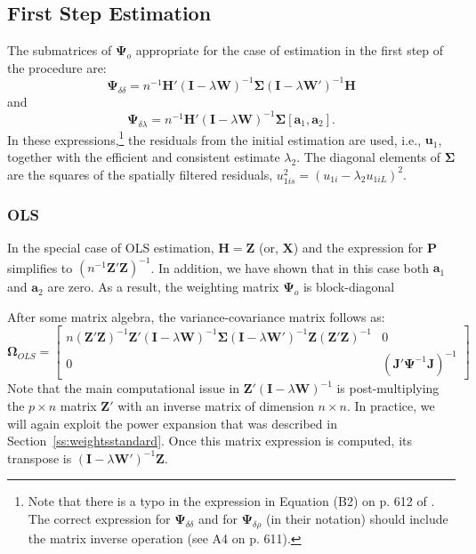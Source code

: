 \documentclass{article}
\begin{document}
\subsection{First Step Estimation}\label{ss:asyvarstandard}
The submatrices of $\mathbf{\Psi}_o$ appropriate for the case of estimation in the
first step of the procedure
are:
\begin{equation}\label{eq:psidd_standard}
\mathbf{\Psi}_{\delta \delta} = n^{-1} \mathbf{H'} (\mathbf{I} - \lambda \mathbf{W} )^{-1} \mathbf{\Sigma}
 (\mathbf{I} - \lambda \mathbf{W'} )^{-1} \mathbf{H}
\end{equation}
and
\begin{equation}\label{eq:psidl_standard}
\mathbf{\Psi}_{\delta \lambda} = n^{-1} \mathbf{H'} (\mathbf{I} - \lambda \mathbf{W} )^{-1} \mathbf{\Sigma} [ \mathbf{a}_1, \mathbf{a}_2 ].
\end{equation}
In these expressions,\footnote{Note that there is a typo in the expression in Equation (B2)
on p. 612 of \cite{Arraizetal:10}. The correct expression for $\mathbf{\Psi}_{\delta \delta}$
and for $\mathbf{\Psi}_{\delta \rho}$ (in their notation) should include the matrix inverse
operation (see A4 on p. 611).}  the residuals from the initial estimation are used, i.e., $\mathbf{u}_1$,
together with the efficient and consistent estimate $\lambda_2$. The diagonal elements
of $\mathbf{\Sigma}$ are the squares of the spatially filtered residuals, $ u_{1is}^2 = (u_{1i} - \lambda_2 u_{1iL} )^{2}$.

\subsubsection{OLS}
In the special case of OLS estimation, $\mathbf{H} = \mathbf{Z}$ (or, $\mathbf{X}$) and the expression
for $\mathbf{P}$ simplifies to $(n^{-1} \mathbf{Z'Z} )^{-1}$. In addition, we have shown that
in this case both $\mathbf{a}_1$ and $\mathbf{a}_2$ are zero. As a result, the weighting
matrix $\mathbf{\Psi}_o$ is block-diagonal

After some matrix algebra, the variance-covariance matrix follows as:
\begin{equation*}
\mathbf{\Omega}_{OLS} =
\left[
\begin{matrix}
n (\mathbf{Z'Z} )^{-1} \mathbf{Z'} ( \mathbf{I} - \lambda \mathbf{W} )^{-1} \mathbf{\Sigma}
 ( \mathbf{I} - \lambda \mathbf{W'} )^{-1} \mathbf{Z} (\mathbf{Z'Z} )^{-1} & 0\\
 0 & ( \mathbf{J'} \mathbf{\Psi}^{-1} \mathbf{J} )^{-1}
 \end{matrix}
\right]
\end{equation*}
Note that the main computational issue in $ \mathbf{Z'} ( \mathbf{I} - \lambda \mathbf{W} )^{-1} $
is post-multiplying the $p \times n$ matrix $\mathbf{Z'}$ with an inverse matrix of dimension
$n \times n$. In practice, we will again exploit the power expansion that was
described in Section~\ref {ss:weightsstandard}.  Once this matrix expression is 
computed, its transpose is  $( \mathbf{I} - \lambda \mathbf{W'} )^{-1} \mathbf{Z}$.
\end{document}
